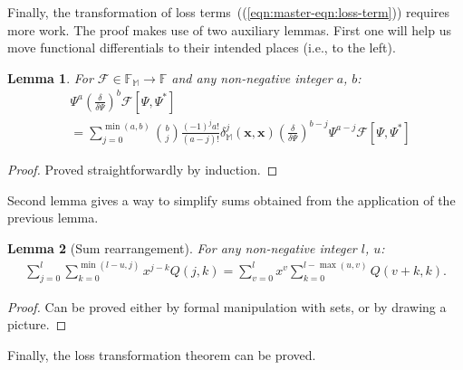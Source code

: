 \documentclass[12pt,aip,jmp,amssymb,amsmath]{revtex4-1}
\newtheorem{lemma}{Lemma}
\begin{document}
Finally, the transformation of loss terms~((\ref{eqn:master-eqn:loss-term})) requires more work.
The proof makes use of two auxiliary lemmas.
First one will help us move functional differentials to their intended places (i.e., to the left).

\begin{lemma}
\label{lmm:transformations:swap-differential}
    For $\mathcal{F} \in \mathbb{F}_{\mathbb{M}} \rightarrow \mathbb{F}$ and any non-negative integer $a$, $b$:
    \begin{eqnarray*}
    &    \Psi^a \left( \frac{\delta}{\delta \Psi} \right)^b \mathcal{F}[\Psi, \Psi^*] \\
    &    = \sum_{j=0}^{\min(a, b)}
            \binom{b}{j} \frac{(-1)^j a!}{(a - j)!}
            \delta_{\mathbb{M}}^j(\boldsymbol{x}, \boldsymbol{x})
            \left( \frac{\delta}{\delta \Psi} \right)^{b - j}
            \Psi^{a - j}
            \mathcal{F}[\Psi, \Psi^*]
    \end{eqnarray*}
\end{lemma}
\begin{proof}
Proved straightforwardly by induction.
\end{proof}

Second lemma gives a way to simplify sums obtained from the application of the previous lemma.

\begin{lemma}[Sum rearrangement]
\label{lmm:transformations:sum-rearrangement}
    For any non-negative integer $l$, $u$:
    \begin{eqnarray*}
        \sum_{j=0}^l \sum_{k=0}^{\min(l-u,j)} x^{j-k} Q(j, k)
        = \sum_{v=0}^l x^v \sum_{k=0}^{l-\max(u,v)} Q(v + k, k).
    \end{eqnarray*}
\end{lemma}
\begin{proof}
Can be proved either by formal manipulation with sets, or by drawing a picture.
\end{proof}

Finally, the loss transformation theorem can be proved.
\end{document}
